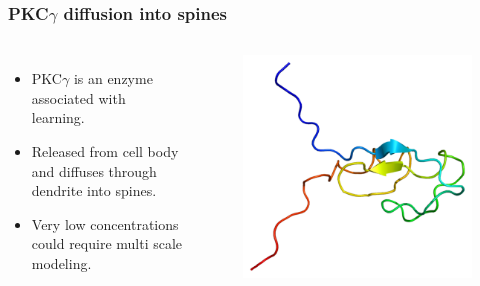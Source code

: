 \begin{frame}
 \frametitle{PKC$\gamma$ diffusion into spines}
 \begin{columns}
  \column{2.0in}
  \begin{itemize}
   \item PKC$\gamma$ is an enzyme associated with learning.
   \item Released from cell body and diffuses through dendrite into spines.
   \item Very low concentrations could require multi scale modeling.
  \end{itemize}
\column{2.0in}
\begin{figure}[H]
\centering
\includegraphics[width=\textwidth]{figures/PKCG.png}
\end{figure}

 \end{columns}

\end{frame}
